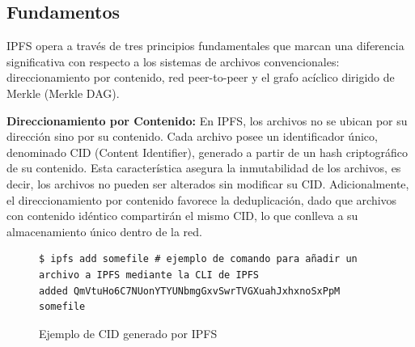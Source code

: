 \subsection{Fundamentos}\label{sect:fundamentos}
IPFS opera a través de tres principios fundamentales que marcan una diferencia significativa con respecto a los sistemas de archivos convencionales: direccionamiento por contenido, red peer-to-peer y el grafo acíclico dirigido de Merkle (Merkle DAG).


\textbf{Direccionamiento por Contenido:} En IPFS, los archivos no se ubican por su dirección sino por su contenido. Cada archivo posee un
identificador único, denominado CID (Content Identifier), generado a partir de un hash criptográfico de su contenido. Esta característica
asegura la inmutabilidad de los archivos, es decir, los archivos no pueden ser alterados sin modificar su CID. Adicionalmente, el
direccionamiento por contenido favorece la deduplicación, dado que archivos con contenido idéntico compartirán el mismo CID, lo que conlleva a
su almacenamiento único dentro de la red.

\begin{figure}[H]
      \begin{verbatim}
$ ipfs add somefile # ejemplo de comando para añadir un archivo a IPFS mediante la CLI de IPFS
added QmVtuHo6C7NUonYTYUNbmgGxvSwrTVGXuahJxhxnoSxPpM somefile
\end{verbatim}
      \caption{Ejemplo de CID generado por IPFS}
      \label{fig:ipfs-add}
\end{figure}


